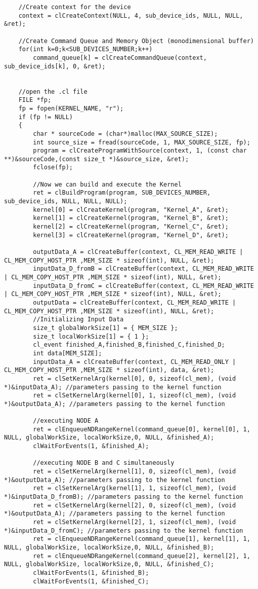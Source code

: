 {\begin{verbatim}
	//Create context for the device
	context = clCreateContext(NULL, 4, sub_device_ids, NULL, NULL, &ret);

	//Create Command Queue and Memory Object (monodimensional buffer)
	for(int k=0;k<SUB_DEVICES_NUMBER;k++)
		command_queue[k] = clCreateCommandQueue(context, sub_device_ids[k], 0, &ret);
	
	
	//open the .cl file
	FILE *fp;
	fp = fopen(KERNEL_NAME, "r");
	if (fp != NULL)
	{
		char * sourceCode = (char*)malloc(MAX_SOURCE_SIZE);
		int source_size = fread(sourceCode, 1, MAX_SOURCE_SIZE, fp);
		program = clCreateProgramWithSource(context, 1, (const char **)&sourceCode,(const size_t *)&source_size, &ret);
		fclose(fp);

		//Now we can build and execute the Kernel
		ret = clBuildProgram(program, SUB_DEVICES_NUMBER, sub_device_ids, NULL, NULL, NULL);
		kernel[0] = clCreateKernel(program, "Kernel_A", &ret);				  
		kernel[1] = clCreateKernel(program, "Kernel_B", &ret);				  
		kernel[2] = clCreateKernel(program, "Kernel_C", &ret);				 
		kernel[3] = clCreateKernel(program, "Kernel_D", &ret);				  
		
		outputData_A = clCreateBuffer(context, CL_MEM_READ_WRITE | CL_MEM_COPY_HOST_PTR ,MEM_SIZE * sizeof(int), NULL, &ret);
		inputData_D_fromB = clCreateBuffer(context, CL_MEM_READ_WRITE | CL_MEM_COPY_HOST_PTR ,MEM_SIZE * sizeof(int), NULL, &ret);
		inputData_D_fromC = clCreateBuffer(context, CL_MEM_READ_WRITE | CL_MEM_COPY_HOST_PTR ,MEM_SIZE * sizeof(int), NULL, &ret);
		outputData = clCreateBuffer(context, CL_MEM_READ_WRITE | CL_MEM_COPY_HOST_PTR ,MEM_SIZE * sizeof(int), NULL, &ret);
		//Initializing Input Data
		size_t globalWorkSize[1] = { MEM_SIZE };
		size_t localWorkSize[1] = { 1 };
		cl_event finished_A,finished_B,finished_C,finished_D;
		int data[MEM_SIZE];
		inputData_A = clCreateBuffer(context, CL_MEM_READ_ONLY | CL_MEM_COPY_HOST_PTR ,MEM_SIZE * sizeof(int), data, &ret);
		ret = clSetKernelArg(kernel[0], 0, sizeof(cl_mem), (void *)&inputData_A); //parameters passing to the kernel function
		ret = clSetKernelArg(kernel[0], 1, sizeof(cl_mem), (void *)&outputData_A); //parameters passing to the kernel function
		
		//executing NODE A
		ret = clEnqueueNDRangeKernel(command_queue[0], kernel[0], 1, NULL, globalWorkSize, localWorkSize,0, NULL, &finished_A); 
		clWaitForEvents(1, &finished_A);

		//executing NODE B and C simultaneously
		ret = clSetKernelArg(kernel[1], 0, sizeof(cl_mem), (void *)&outputData_A); //parameters passing to the kernel function
		ret = clSetKernelArg(kernel[1], 1, sizeof(cl_mem), (void *)&inputData_D_fromB); //parameters passing to the kernel function
		ret = clSetKernelArg(kernel[2], 0, sizeof(cl_mem), (void *)&outputData_A); //parameters passing to the kernel function
		ret = clSetKernelArg(kernel[2], 1, sizeof(cl_mem), (void *)&inputData_D_fromC); //parameters passing to the kernel function
		ret = clEnqueueNDRangeKernel(command_queue[1], kernel[1], 1, NULL, globalWorkSize, localWorkSize,0, NULL, &finished_B);
		ret = clEnqueueNDRangeKernel(command_queue[2], kernel[2], 1, NULL, globalWorkSize, localWorkSize,0, NULL, &finished_C); 
		clWaitForEvents(1, &finished_B);
		clWaitForEvents(1, &finished_C);


\end{verbatim}}
